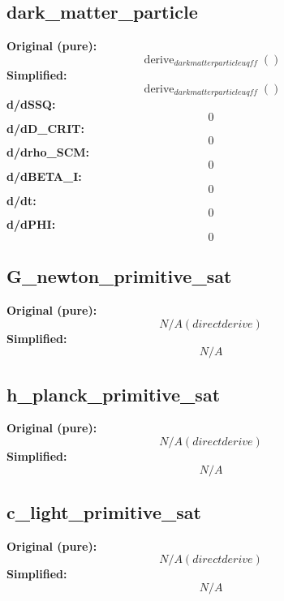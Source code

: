 \subsection{dark_matter_particle}
\textbf{Original (pure):}
\begin{equation}
\operatorname{derive}_{dark matter particle uqff}{\left( \right)}
\end{equation}
\textbf{Simplified:}
\begin{equation}
\operatorname{derive}_{dark matter particle uqff}{\left( \right)}
\end{equation}
\textbf{d/dSSQ:}
\begin{equation}
0
\end{equation}
\textbf{d/dD_CRIT:}
\begin{equation}
0
\end{equation}
\textbf{d/drho_SCM:}
\begin{equation}
0
\end{equation}
\textbf{d/dBETA_I:}
\begin{equation}
0
\end{equation}
\textbf{d/dt:}
\begin{equation}
0
\end{equation}
\textbf{d/dPHI:}
\begin{equation}
0
\end{equation}

\subsection{G_newton_primitive_sat}
\textbf{Original (pure):}
\begin{equation}
N/A (direct derive)
\end{equation}
\textbf{Simplified:}
\begin{equation}
N/A
\end{equation}

\subsection{h_planck_primitive_sat}
\textbf{Original (pure):}
\begin{equation}
N/A (direct derive)
\end{equation}
\textbf{Simplified:}
\begin{equation}
N/A
\end{equation}

\subsection{c_light_primitive_sat}
\textbf{Original (pure):}
\begin{equation}
N/A (direct derive)
\end{equation}
\textbf{Simplified:}
\begin{equation}
N/A
\end{equation}

